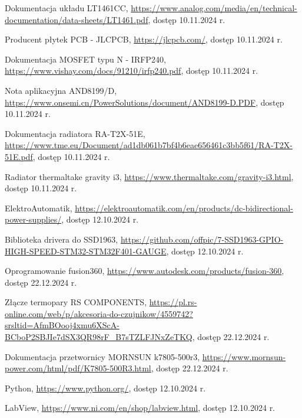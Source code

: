 \begin{thebibliography}{}
 Dokumentacja układu LT1461CC, \url{https://www.analog.com/media/en/technical-documentation/data-sheets/LT1461.pdf}, dostęp 10.11.2024 r.

 Producent płytek PCB - JLCPCB, \url{https://jlcpcb.com/}, dostęp 10.11.2024 r.

 Dokumentacja MOSFET typu N - IRFP240, \url{https://www.vishay.com/docs/91210/irfp240.pdf}, dostęp 10.11.2024 r.

 Nota aplikacyjna AND8199/D, \url{https://www.onsemi.cn/PowerSolutions/document/AND8199-D.PDF}, dostęp 10.11.2024 r.

 Dokumentacja radiatora RA-T2X-51E, \url{https://www.tme.eu/Document/ad1db061b7bf4b6eae656461c3bb5f61/RA-T2X-51E.pdf}, dostęp 10.11.2024 r.

 Radiator thermaltake gravity i3, \url{https://www.thermaltake.com/gravity-i3.html}, dostęp 10.11.2024 r.

 ElektroAutomatik, \url{https://elektroautomatik.com/en/products/dc-bidirectional-power-supplies/}, dostęp 12.10.2024 r.

 Biblioteka drivera do SSD1963, \url{https://github.com/offpic/7-SSD1963-GPIO-HIGH-SPEED-STM32-STM32F401-GAUGE}, dostęp 12.10.2024 r.

 Oprogramowanie fusion360, \url{https://www.autodesk.com/products/fusion-360}, dostęp 22.12.2024 r.

 Złącze termopary RS COMPONENTS, \url{https://pl.rs-online.com/web/p/akcesoria-do-czujnikow/4559742?srsltid=AfmBOooj4xmu6XScA-BCboP2SBJIe7dSX3QR98rF_B7sTZLFJNxZeTKQ}, dostęp 22.12.2024 r.

 Dokumentacja przetwornicy MORNSUN k7805-500r3, \url{https://www.mornsun-power.com/html/pdf/K7805-500R3.html}, dostęp 22.12.2024 r.

 Python, \url{https://www.python.org/}, dostęp 12.10.2024 r.

 LabView, \url{https://www.ni.com/en/shop/labview.html}, dostęp 12.10.2024 r.

\end{thebibliography}
